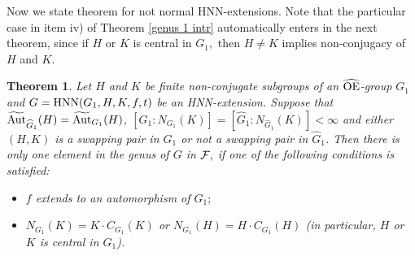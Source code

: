 \documentclass[a4paper,12pt]{article}
\newtheorem{thm}{Theorem}[section]
\newcommand{\Oe}{\rm \widehat{OE}}
\newcommand{\F}{{\cal F}}
\def\aut {{\rm Aut}}
\def\hnn {{\rm HNN}}
\begin{document}
{%


Now we state theorem for not 
normal HNN-extensions. Note that the particular case in item iv) of Theorem \ref{genus 1 intr} automatically enters in the next theorem,  since if $H$ or $K$ is central in $G_1,$ then $H\neq K$ implies non-conjugacy of $H$ and $K$.



\begin{thm}\label{genus 1}
Let $H$ and $K$ be  finite non-conjugate subgroups of an $\Oe$-group $G_1$ and $G=\hnn(G_1, H, K, f, t)$ be an HNN-extension.
Suppose that $\widetilde{\aut}_{\widehat{G}_1}(H)=\widetilde{\aut}_{G_1}(H)$,   $[G_1:N_{G_1}(K)]=[\widehat G_1:N_{\widehat G_1}(K)]<\infty$ and 
     either $(H,K)$ is a swapping pair in $G_1$ or  not a swapping pair in $\widehat G_1$. 
 Then there is only one element in the genus of $G$ in $\F,$ if one of the following conditions is satisfied:
\begin{itemize} 
\item[i)]   
     $f$ extends to an automorphism of $G_1;$    
    \item [ii)] $N_{G_1}(K)=K \cdot C_{G_1}(K)$ or $N_{G_1}(H)=H \cdot C_{G_1}(H)$ (in particular,  $H$ or $K$ is central in $G_1$).  
\end{itemize}
\end{thm}


}
\end{document}
